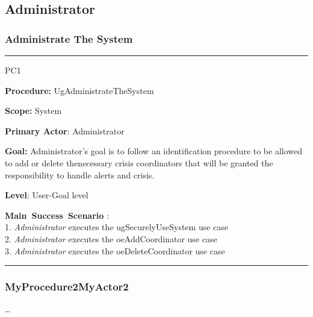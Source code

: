 \subsection{Administrator}

\subsubsection{Administrate The System}
\vspace{0.5cm}
\hrule
\begin{lyxlist}{PC1}
\small{
\item [\textbf{Procedure:}] UgAdministrateTheSystem
\item [\textbf{Scope:}] System
\item [\textbf{Primary Actor}:] Administrator
\item [\textbf{Goal:}] Administrator’s goal is to follow an identification procedure to be allowed to add or delete thenecessary crisis coordinators that will be granted the responsibility to handle alerts and crisis.
\item [\textbf{Level}:] User-Goal level
\item [\textbf{Main~Success~Scenario}]:\\
1. \emph{Administrator} executes the ugSecurelyUseSystem use case\\
2. \emph{Administrator} executes the oeAddCoordinator use case\\
3. \emph{Administrator} executes the oeDeleteCoordinator use case\\

}

\end{lyxlist}
\hrule
\vspace{0.5cm}

\subsubsection{MyProcedure2MyActor2}
\ldots














